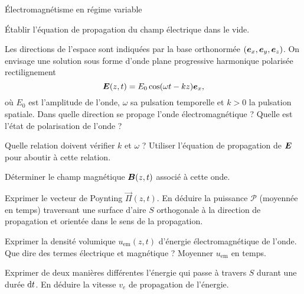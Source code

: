 \begin{td}{Électromagnétisme en régime variable}
	\begin{exlist}
		\item Établir l'équation de propagation du champ électrique dans 
		  le vide.
		\item Les directions de l'espace sont indiquées par la base 
		  orthonormée $(\ex, \ey, \ez)$. On envisage une solution sous 
		  forme d'onde plane progressive harmonique polarisée rectilignement
		  \begin{equation*}
			  \vece(z, t) = E_0 \cos(\omega t - k z)\ex,
		  \end{equation*}
		  où $E_0$ est l'amplitude de l'onde, $\omega$ sa pulsation temporelle
		  et $k > 0$ la pulsation spatiale. Dans quelle direction se propage
		  l'onde électromagnétique ? Quelle est l'état de polarisation 
		  de l'onde ?
	  	\item Quelle relation doivent vérifier $k$ et $\omega$ ? Utiliser
		  l'équation de propagation de $\vece$ pour aboutir à cette relation.
	  \item Déterminer le champ magnétique $\vecb(z, t)$ associé à cette onde.
	  \item Exprimer le vecteur de Poynting $\vec{\Pi}(z, t)$. 
		  En déduire la puissance 
		  $\mathcal{P}$ (moyennée en temps) traversant une surface d'aire
		  $S$ orthogonale à la direction de propagation et orientée
		  dans le sens de la propagation.
	  \item Exprimer la densité volumique $u_\mathrm{em}(z, t)$ d'énergie 
		  électromagnétique de l'onde. Que dire des termes électrique
		  et magnétique ? Moyenner $u_\mathrm{em}$ en temps. 
		\item Exprimer de deux manières différentes l'énergie qui passe 
		  à travers $S$ durant une durée $\mathrm{d}t$. En déduire
		  la vitesse $v_e$ de propagation de l'énergie.
	\end{exlist}



\end{td}

